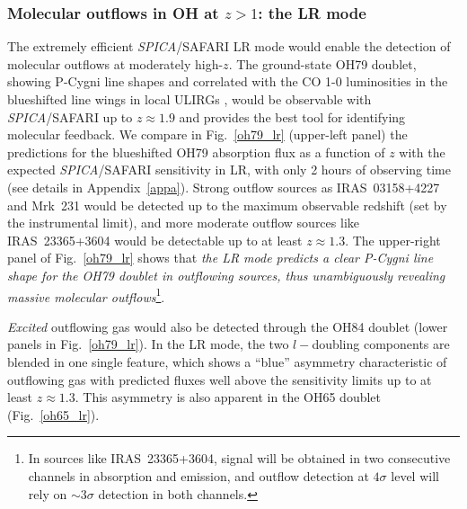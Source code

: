 \documentclass{pasa}%
\begin{document}

\subsubsection{Molecular outflows in OH at $z>1$: the LR mode}
\label{sec:highz}



The extremely efficient {\it SPICA}/SAFARI LR mode would enable the detection
of molecular outflows at moderately high-$z$. The ground-state OH79
doublet, showing P-Cygni line shapes and correlated with the CO 1-0
luminosities in the blueshifted line wings in local ULIRGs
\citep[][GA17]{stu11}, would be observable with {\it SPICA}/SAFARI up to
$z\approx1.9$ and provides the best tool for identifying molecular feedback. 
We compare in Fig.~\ref{oh79_lr}
(upper-left panel) the predictions for the blueshifted OH79 absorption flux as
a function of $z$ with the expected {\it SPICA}/SAFARI sensitivity in LR, with
only 2 hours of observing time (see details in Appendix~\ref{appa}). Strong
outflow sources as IRAS~03158+4227 and Mrk~231 would be detected up to the
maximum observable redshift (set by the instrumental limit), and more
moderate outflow sources like 
IRAS~23365+3604 would be detectable up to at least $z\approx1.3$. The
upper-right panel of Fig.~\ref{oh79_lr} shows that 
{\em the LR mode predicts a clear P-Cygni line
  shape for the OH79 doublet in outflowing sources, thus unambiguously
  revealing massive molecular outflows}\footnote{In sources like
  IRAS~23365+3604, signal will be obtained in two consecutive channels in
  absorption and emission, and outflow detection at $4\sigma$ level will rely
  on $\sim3\sigma$ detection in both channels.}. 


{\em Excited} outflowing gas would also be detected through the OH84 doublet
(lower panels in Fig.~\ref{oh79_lr}). In the LR mode, the two $l-$doubling
components are blended in one single feature, which shows a ``blue'' 
asymmetry characteristic of outflowing gas with predicted fluxes well above
the sensitivity limits up to at least $z\approx1.3$. This asymmetry is also
apparent in the OH65 doublet (Fig.~\ref{oh65_lr}).
\end{document}

